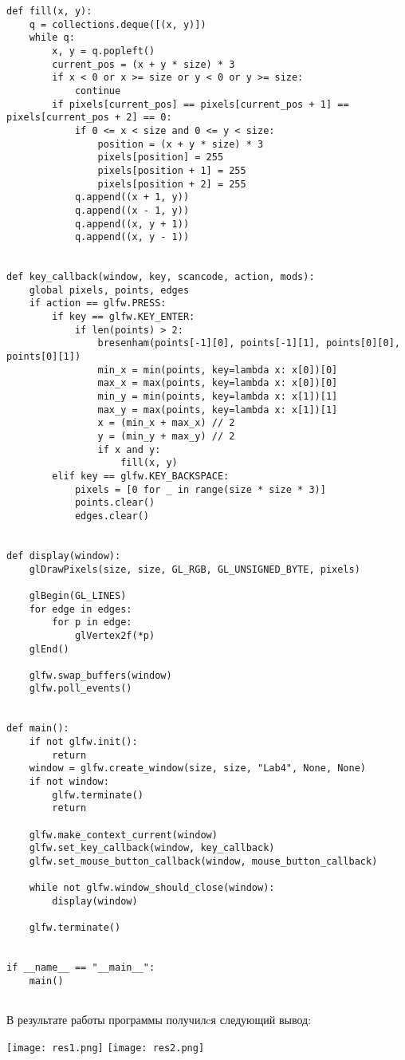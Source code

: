 \documentclass[a4paper, 14pt]{extarticle}
\begin{document}
\begin{lstlisting}
def fill(x, y):
    q = collections.deque([(x, y)])
    while q:
        x, y = q.popleft()
        current_pos = (x + y * size) * 3
        if x < 0 or x >= size or y < 0 or y >= size:
            continue
        if pixels[current_pos] == pixels[current_pos + 1] == pixels[current_pos + 2] == 0:
            if 0 <= x < size and 0 <= y < size:
                position = (x + y * size) * 3
                pixels[position] = 255
                pixels[position + 1] = 255
                pixels[position + 2] = 255
            q.append((x + 1, y))
            q.append((x - 1, y))
            q.append((x, y + 1))
            q.append((x, y - 1))


def key_callback(window, key, scancode, action, mods):
    global pixels, points, edges
    if action == glfw.PRESS:
        if key == glfw.KEY_ENTER:
            if len(points) > 2:
                bresenham(points[-1][0], points[-1][1], points[0][0], points[0][1])
                min_x = min(points, key=lambda x: x[0])[0]
                max_x = max(points, key=lambda x: x[0])[0]
                min_y = min(points, key=lambda x: x[1])[1]
                max_y = max(points, key=lambda x: x[1])[1]
                x = (min_x + max_x) // 2
                y = (min_y + max_y) // 2
                if x and y:
                    fill(x, y)
        elif key == glfw.KEY_BACKSPACE:
            pixels = [0 for _ in range(size * size * 3)]
            points.clear()
            edges.clear()


def display(window):
    glDrawPixels(size, size, GL_RGB, GL_UNSIGNED_BYTE, pixels)

    glBegin(GL_LINES)
    for edge in edges:
        for p in edge:
            glVertex2f(*p)
    glEnd()

    glfw.swap_buffers(window)
    glfw.poll_events()


def main():
    if not glfw.init():
        return
    window = glfw.create_window(size, size, "Lab4", None, None)
    if not window:
        glfw.terminate()
        return

    glfw.make_context_current(window)
    glfw.set_key_callback(window, key_callback)
    glfw.set_mouse_button_callback(window, mouse_button_callback)

    while not glfw.window_should_close(window):
        display(window)

    glfw.terminate()


if __name__ == "__main__":
    main()


\end{lstlisting}
В результате работы программы получилcя следующий вывод:
\begin{center}
    \texttt{[image: res1.png]}
    \newpage
    \texttt{[image: res2.png]}
\end{center}
\pagebreak
\end{document}
